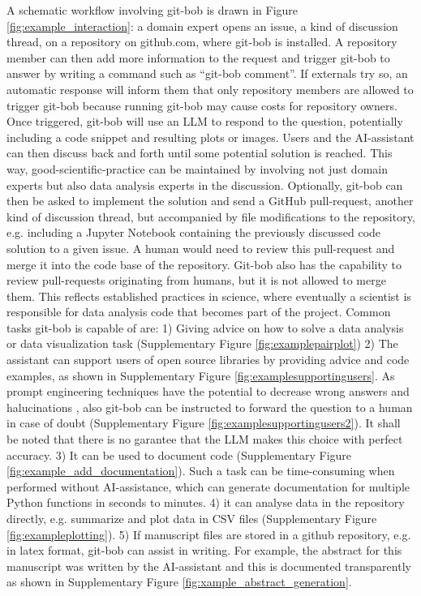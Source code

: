 \documentclass[times, twoside]{zHenriquesLab-StyleBioRxiv}
\begin{document}
A schematic workflow involving git-bob is drawn in Figure \ref{fig:example_interaction}: a domain expert opens an issue, a kind of discussion thread, on a repository on github.com, where git-bob is installed. A repository member can then add more information to the request and trigger git-bob to answer by writing a command such as ``git-bob comment''. If externals try so, an automatic response will inform them that only repository members are allowed to trigger git-bob because running git-bob may cause costs for repository owners. Once triggered, git-bob will use an LLM to respond to the question, potentially including a code snippet and resulting plots or images. Users and the AI-assistant can then discuss back and forth until some potential solution is reached. This way, good-scientific-practice can be maintained by involving not just domain experts but also data analysis experts in the discussion. Optionally, git-bob can then be asked to implement the solution and send a GitHub pull-request, another kind of discussion thread, but accompanied by file modifications to the repository, e.g. including a Jupyter Notebook containing the previously discussed code solution to a given issue. A human would need to review this pull-request and merge it into the code base of the repository. Git-bob also has the capability to review pull-requests originating from humans, but it is not allowed to merge them. This reflects established practices in science, where eventually a scientist is responsible for data analysis code that becomes part of the project. Common tasks git-bob is capable of are: 1) Giving advice on how to solve a data analysis or data visualization task (Supplementary Figure \ref{fig:examplepairplot}) 2) The assistant can support users of open source libraries by providing advice and code examples, as shown in Supplementary Figure \ref{fig:examplesupportingusers}. As prompt engineering techniques have the potential to decrease wrong answers and halucinations \cite{yin2023largelanguagemodelsknow}, also git-bob can be instructed to forward the question to a human in case of doubt (Supplementary Figure \ref{fig:examplesupportingusers2}). It shall be noted that there is no garantee that the LLM makes this choice with perfect accuracy. 3) It can be used to document code (Supplementary Figure \ref{fig:example_add_documentation}). Such a task can be time-consuming when performed without AI-assistance, which can generate documentation for multiple Python functions in seconds to minutes. 4) it can analyse data in the repository directly, e.g. summarize and plot data in CSV files (Supplementary Figure \ref{fig:exampleplotting}). 5) If manuscript files are stored in a github repository, e.g. in latex format, git-bob can assist in writing. For example, the abstract for this manuscript was written by the AI-assistant and this is documented transparently as shown in Supplementary Figure \ref{fig:xample_abstract_generation}.
\end{document}
